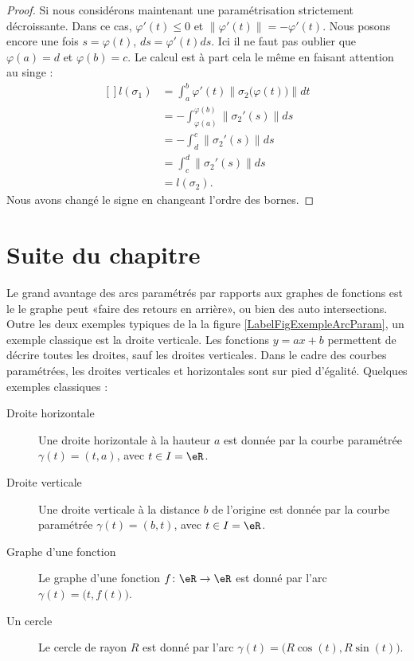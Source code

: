 \begin{proof}
    Si nous considérons maintenant une paramétrisation strictement décroissante. Dans ce cas, $\varphi'(t)\leq 0$ et $\| \varphi'(t) \|=-\varphi'(t)$. Nous posons encore une fois $s=\varphi(t)$, $ds=\varphi'(t)ds$. Ici il ne faut pas oublier que $\varphi(a)=d$ et $\varphi(b)=c$. Le calcul est à part cela le même en faisant attention au singe :
    \begin{equation}
        \begin{aligned}[]
            l(\sigma_1)&=\int_a^b\varphi'(t)\| \sigma_2\big( \varphi(t) \big) \|dt\\
            &=-\int_{\varphi(a)}^{\varphi(b)}\| \sigma_2'(s) \|ds\\
            &=-\int_d^c\| \sigma_2'(s) \|ds\\
            &=\int_c^d\| \sigma_2'(s) \|ds\\
            &=l(\sigma_2).
        \end{aligned}
    \end{equation}
    Nous avons changé le signe en changeant l'ordre des bornes.
\end{proof}

\section{Suite du chapitre}

Le grand avantage des arcs paramétrés par rapports aux graphes de fonctions est le le graphe peut «faire des retours en arrière», ou bien des auto intersections. Outre les deux exemples typiques de la la figure \ref{LabelFigExempleArcParam}, un exemple classique est la droite verticale. Les fonctions $y=ax+b$ permettent de décrire toutes les droites, sauf les droites verticales. Dans le cadre des courbes paramétrées, les droites verticales et horizontales sont sur pied d'égalité. Quelques exemples classiques :
\begin{description}
    \item[Droite horizontale] Une droite horizontale à la hauteur $a$ est donnée par la courbe paramétrée $\gamma(t)=(t,a)$, avec $t\in I=\eR$.
    \item[Droite verticale] Une droite verticale à la distance $b$ de l'origine est donnée par la courbe paramétrée $\gamma(t)=(b,t)$, avec $t\in I=\eR$.
    \item[Graphe d'une fonction]\label{PgGrqFnGamma} Le graphe d'une fonction $f\colon \eR\to \eR$ est donné par l'arc $\gamma(t)=\big( t,f(t) \big)$. 
    \item[Un cercle] Le cercle de rayon $R$ est donné par l'arc $\gamma(t)=\big( R\cos(t),R\sin(t) \big)$.
\end{description}

